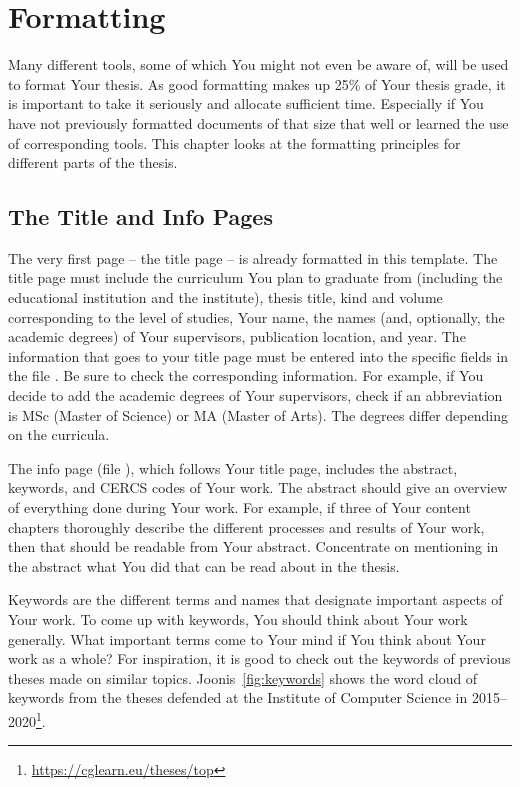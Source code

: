 \section{Formatting}  \label{formatting}
Many different tools, some of which You might not even be aware of, will be used to format Your thesis. As good formatting makes up 25\% of Your thesis grade, it is important to take it seriously and allocate sufficient time. Especially if You have not previously formatted documents of that size that well or learned the use of corresponding tools. This chapter looks at the formatting principles for different parts of the thesis.

\subsection{The Title and Info Pages}
The very first page – the title page – is already formatted in this template. The title page must include the curriculum You plan to graduate from (including the educational institution and the institute), thesis title, kind and volume corresponding to the level of studies, Your name, the names (and, optionally, the academic degrees) of Your supervisors, publication location, and year. The information that goes to your title page must be entered into the specific fields in the file . Be sure to check the corresponding information. For example, if You decide to add the academic degrees of Your supervisors, check if an abbreviation is MSc (Master of Science) or MA (Master of Arts). The degrees differ depending on the curricula.

The info page (file ), which follows Your title page, includes the abstract, keywords, and CERCS codes of Your work. The abstract should give an overview of everything done during Your work. For example, if three of Your content chapters thoroughly describe the different processes and results of Your work, then that should be readable from Your abstract. Concentrate on mentioning in the abstract what You did that can be read about in the thesis.

Keywords are the different terms and names that designate important aspects of Your work. To come up with keywords, You should think about Your work generally. What important terms come to Your mind if You think about Your work as a whole? For inspiration, it is good to check out the keywords of previous theses made on similar topics. Joonis~\ref{fig:keywords} shows the word cloud of keywords from the theses defended at the Institute of Computer Science in 2015–2020\footnote{\url{https://cglearn.eu/theses/top}}.

